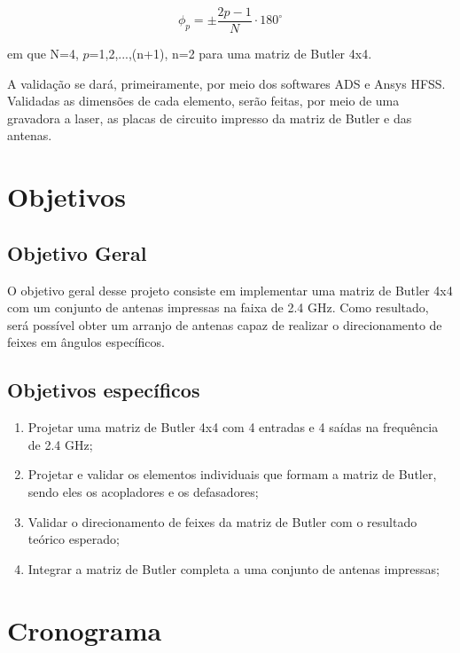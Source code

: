 \documentclass[
	12pt,				%
	oneside,			%
	a4paper,			%
	english,			%
	french,				%
	spanish,			%
	brazil,				%
	]{abntex2}
\begin{document}
\begin{equation}\label{eq:defasagem}
  \phi_{p}= \pm \frac{2p-1}{N} \cdot 180^\circ
\end{equation}

em que N=4, $p$=1,2,...,(n+1), n=2 para uma matriz de Butler 4x4.

A validação se dará, primeiramente, por meio dos softwares ADS e Ansys HFSS. Validadas as dimensões de cada elemento, serão feitas, por meio de uma gravadora a laser, as placas de circuito impresso da matriz de Butler e das antenas.

\chapter[Objetivos]{Objetivos}

\section{Objetivo Geral}
O objetivo geral desse projeto consiste em implementar uma matriz de Butler 4x4 com um conjunto de antenas impressas na faixa de 2.4 GHz. Como resultado, será possível obter um arranjo de antenas capaz de realizar o direcionamento de feixes em ângulos específicos.


\section{Objetivos específicos}
\begin{enumerate}
	\item Projetar uma matriz de Butler 4x4 com 4 entradas e 4 saídas na frequência de 2.4 GHz;
	\item Projetar e validar os elementos individuais que formam a matriz de Butler, sendo eles os acopladores e os defasadores;
	\item Validar o direcionamento de feixes da matriz de Butler com o resultado teórico esperado;
	\item Integrar a matriz de Butler completa a uma conjunto de antenas impressas;
\end{enumerate}

\chapter[Cronograma]{Cronograma}
\end{document}

